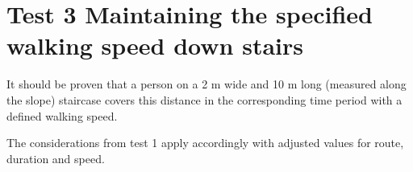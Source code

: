 \section*{Test 3 Maintaining the specified walking speed down stairs}
It should be proven that a person on a 2 m wide and 10 m long (measured along the slope) staircase covers this distance in the corresponding time period with a defined walking speed.

\noindent
The considerations from test 1 apply accordingly with adjusted values for route, duration and speed.


